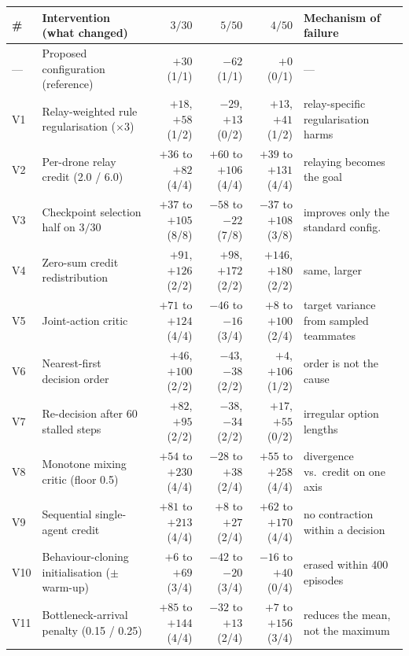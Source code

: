 \begin{tabular}{llrrrl}
\toprule
\# & Intervention (what changed) & $3/30$ & $5/50$ & $4/50$ & Mechanism of failure \\
\midrule
--- & Proposed configuration (reference) & $+30$ (1/1) & $-62$ (1/1) & $+0$ (0/1) & --- \\
V1 & Relay-weighted rule regularisation ($\times 3$) & $+18$, $+58$ (1/2) & $-29$, $+13$ (0/2) & $+13$, $+41$ (1/2) & relay-specific regularisation harms \\
V2 & Per-drone relay credit (2.0 / 6.0) & $+36$ to $+82$ (4/4) & $+60$ to $+106$ (4/4) & $+39$ to $+131$ (4/4) & relaying becomes the goal \\
V3 & Checkpoint selection half on $3/30$ & $+37$ to $+105$ (8/8) & $-58$ to $-22$ (7/8) & $-37$ to $+108$ (3/8) & improves only the standard config. \\
V4 & Zero-sum credit redistribution & $+91$, $+126$ (2/2) & $+98$, $+172$ (2/2) & $+146$, $+180$ (2/2) & same, larger \\
V5 & Joint-action critic & $+71$ to $+124$ (4/4) & $-46$ to $-16$ (3/4) & $+8$ to $+100$ (2/4) & target variance from sampled teammates \\
V6 & Nearest-first decision order & $+46$, $+100$ (2/2) & $-43$, $-38$ (2/2) & $+4$, $+106$ (1/2) & order is not the cause \\
V7 & Re-decision after 60 stalled steps & $+82$, $+95$ (2/2) & $-38$, $-34$ (2/2) & $+17$, $+55$ (0/2) & irregular option lengths \\
V8 & Monotone mixing critic (floor 0.5) & $+54$ to $+230$ (4/4) & $-28$ to $+38$ (2/4) & $+55$ to $+258$ (4/4) & divergence vs.\ credit on one axis \\
V9 & Sequential single-agent credit & $+81$ to $+213$ (4/4) & $+8$ to $+27$ (2/4) & $+62$ to $+170$ (4/4) & no contraction within a decision \\
V10 & Behaviour-cloning initialisation ($\pm$ warm-up) & $+6$ to $+69$ (3/4) & $-42$ to $-20$ (3/4) & $-16$ to $+40$ (0/4) & erased within 400 episodes \\
V11 & Bottleneck-arrival penalty (0.15 / 0.25) & $+85$ to $+144$ (4/4) & $-32$ to $+13$ (2/4) & $+7$ to $+156$ (3/4) & reduces the mean, not the maximum \\
\bottomrule
\end{tabular}%
